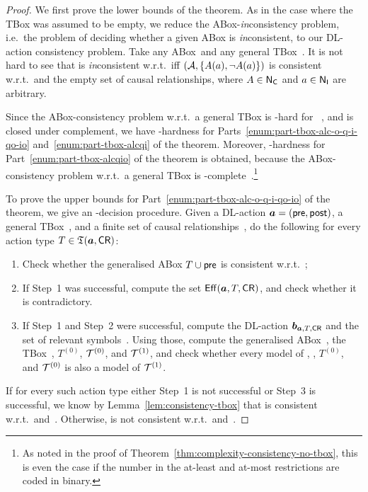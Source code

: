 \begin{proof}
    We first prove the lower bounds of the theorem.  As in the case where the
    TBox was assumed to be empty, we reduce the ABox-\emph{in}consistency
    problem, i.e.~the problem of deciding whether a given ABox is
    \emph{in}consistent, to our DL-action consistency problem.  Take any
    ABox~\Amc and any general TBox~\Tmc.  It is not hard to see that \Amc is
    \emph{in}consistent w.r.t.~\Tmc iff $(\mathcal{A},\{A(a),\lnot A(a)\})$
    is consistent w.r.t.~\Tmc and the empty set of causal relationships, where
    $A\in\mathsf{N_C}$ and $a\in\mathsf{N_I}$ are arbitrary.

    Since the ABox-consistency problem w.r.t.\ a general TBox is \ExpTime-hard
    for \ALC~\cite{Sch-IJCAI91}, and \ExpTime is closed under complement, we
    have \ExpTime-hardness for Parts~\ref{enum:part-tbox-alc-o-q-i-qo-io}
    and~\ref{enum:part-tbox-alcqi} of the theorem.  Moreover,
    \coNExpTime-hardness for Part~\ref{enum:part-tbox-alcqio} of the theorem is
    obtained, because the ABox-consistency problem w.r.t.\ a general TBox is
    \NExpTime-complete~\cite{Sch-DKE94,Tob-JAIR00,Pra-JLLI05}.\footnote{%
        As noted in the proof of
        Theorem~\ref{thm:complexity-consistency-no-tbox}, this is even the case
        if the number in the at-least and at-most restrictions are coded in
        binary.}

    To prove the upper bounds for Part~\ref{enum:part-tbox-alc-o-q-i-qo-io} of
    the theorem, we give an \ExpTime-decision procedure.  Given a DL-action
    $\boldsymbol a=(\mathsf{pre},\mathsf{post})$, a general TBox~\Tmc, and a finite set of
    causal relationships~\CR, do the following for every action type
    $T\in\mathfrak{T}(\boldsymbol a,\mathsf{CR})$:
    \begin{enumerate}
        \item Check whether the generalised ABox $T\cup\mathsf{pre}$ is consistent w.r.t.~\Tmc;
        \item If Step~1 was successful, compute the set $\operatorname{\mathsf{Eff}}(\boldsymbol a,T,\mathsf{CR})$, and
            check whether it is contradictory.
        \item If Step~1 and Step~2 were successful, compute the DL-action
            $\boldsymbol b_{\boldsymbol a,T,\mathsf{CR}}$ and the set of relevant symbols~\Rmc.  Using
            those, compute the generalised ABox~\Ared, the TBox~\Tred,
            $T^{(0)}$, $\mathcal{T}^{(0)}$, and $\mathcal{T}^{(1)}$, and check whether every
            model of \Ared, \Tred, $T^{(0)}$, and $\mathcal{T}^{(0)}$ is also a model
            of $\mathcal{T}^{(1)}$.
    \end{enumerate}
    If for every such action type either Step~1 is not successful or Step~3 is
    successful, we know by Lemma~\ref{lem:consistency-tbox} that \abf is
    consistent w.r.t.~\Tmc and~\CR.  Otherwise, \abf is not consistent
    w.r.t.~\Tmc and~\CR.


\end{proof}
